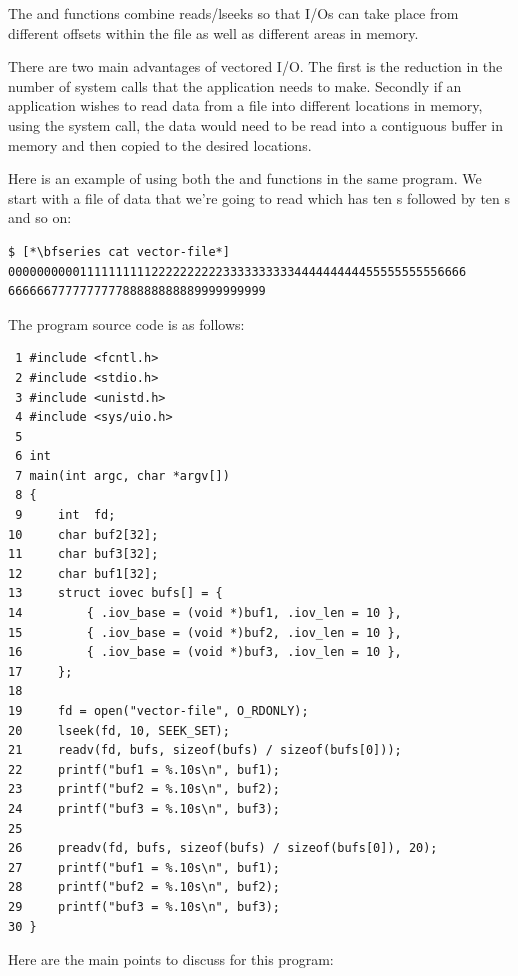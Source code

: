 \noindent
The  and  functions combine reads/lseeks so that I/Os can take place from different offsets within the file as well as different areas in memory.

There are two main advantages of vectored I/O. The first is the reduction in the number of system calls that the application needs to make. Secondly if an application wishes to read data from a file into different locations in memory, using the  system call, the data would need to be read into a contiguous buffer in memory and then copied to the desired locations.

Here is an example of using both the  and  functions in the same program. We start with a file of data that we're going to read which has ten s followed by ten s and so on:

\begin{lstlisting}
$ [*\bfseries cat vector-file*]
0000000000111111111122222222223333333333444444444455555555556666
666666777777777788888888889999999999
\end{lstlisting}

\noindent
The program source code is as follows:

\begin{lstlisting}
 1 #include <fcntl.h>
 2 #include <stdio.h>
 3 #include <unistd.h>
 4 #include <sys/uio.h>
 5  
 6 int
 7 main(int argc, char *argv[])
 8 {
 9     int  fd;
10     char buf2[32];
11     char buf3[32];
12     char buf1[32];
13     struct iovec bufs[] = {
14         { .iov_base = (void *)buf1, .iov_len = 10 },
15         { .iov_base = (void *)buf2, .iov_len = 10 },
16         { .iov_base = (void *)buf3, .iov_len = 10 },
17     };
18  
19     fd = open("vector-file", O_RDONLY);
20     lseek(fd, 10, SEEK_SET);
21     readv(fd, bufs, sizeof(bufs) / sizeof(bufs[0]));
22     printf("buf1 = %.10s\n", buf1);
23     printf("buf2 = %.10s\n", buf2);
24     printf("buf3 = %.10s\n", buf3);
25  
26     preadv(fd, bufs, sizeof(bufs) / sizeof(bufs[0]), 20);
27     printf("buf1 = %.10s\n", buf1);
28     printf("buf2 = %.10s\n", buf2);
29     printf("buf3 = %.10s\n", buf3);
30 }
\end{lstlisting}

\noindent
Here are the main points to discuss for this program:

